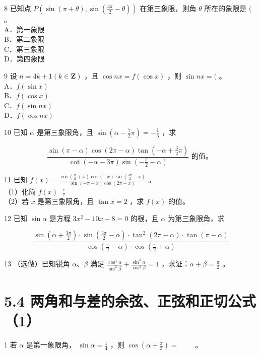 \documentclass[10pt]{article}
\begin{document}
8 已知点 \(P\left(\sin (\pi+\theta), \sin \left(\frac{3 \pi}{2}-\theta\right)\right)\) 在第三象限，则角 \(\theta\) 所在的象限是 \((\) 。\\
A．第一象限\\
B．第二象限\\
C．第三象限\\
D．第四象限

9 设 \(n=4 k+1(k \in \mathbf{Z})\) ，且 \(\cos n x=f(\cos x)\) ，则 \(\sin n x=(\) 。\\
A．\(f(\sin x)\)\\
B．\(f(\cos x)\)\\
C．\(f(\sin n x)\)\\
D．\(f(\cos n x)\)

10 已知 \(\alpha\) 是第三象限角，且 \(\sin \left(\alpha-\frac{7}{2} \pi\right)=-\frac{1}{5}\) ，求

\[
\frac{\sin (\pi-\alpha) \cos (2 \pi-\alpha) \tan \left(-\alpha+\frac{3}{2} \pi\right)}{\cot (-\alpha-3 \pi) \sin \left(-\frac{\pi}{2}-\alpha\right)} \text { 的值。 }
\]

11 已知 \(f(x)=\frac{\cos \left(\frac{\pi}{2}+x\right) \cos (-x) \sin \left(\frac{3 \pi}{2}-x\right)}{\sin (-\pi-x) \cos (2 \pi-x)}\) 。\\
（1）化简 \(f(x)\) ；\\
（2）若 \(x\) 是第三象限角，且 \(\tan x=2\) ，求 \(f(x)\) 的值。

12 已知 \(\sin \alpha\) 是方程 \(3 x^{2}-10 x-8=0\) 的根，且 \(\alpha\) 为第三象限角，求

\[
\frac{\sin \left(\alpha+\frac{3 \pi}{2}\right) \cdot \sin \left(\frac{3 \pi}{2}-\alpha\right) \cdot \tan ^{2}(2 \pi-\alpha) \cdot \tan (\pi-\alpha)}{\cos \left(\frac{\pi}{2}-\alpha\right) \cdot \cos \left(\frac{\pi}{2}+\alpha\right)}
\]

13 （选做）已知锐角 \(\alpha 、 \beta\) 满足 \(\frac{\cos ^{4} \alpha}{\sin ^{2} \beta}+\frac{\sin ^{4} \alpha}{\cos ^{2} \beta}=1\) ，求证：\(\alpha+\beta=\frac{\pi}{2}\) 。

\section*{5.4 两角和与差的余弦、正弦和正切公式（1）}
1 若 \(\alpha\) 是第一象限角， \(\sin \alpha=\frac{1}{4}\) ，则 \(\cos \left(\alpha+\frac{\pi}{3}\right)=\) \(\qquad\)。
\end{document}

